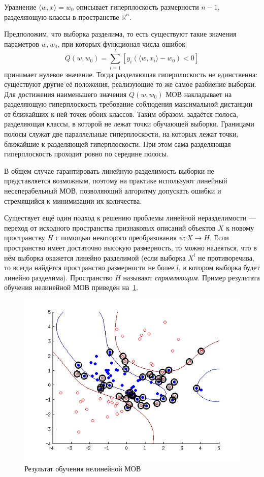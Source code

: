 Уравнение $ \langle w, x \rangle = w_0 $ описывает гиперплоскость размерности $ n - 1 $, разделяющую классы в пространстве $ \mathbb{R}^n $.

Предположим, что выборка разделима, то есть существуют такие значения параметров $ w, w_0 $, при которых функционал числа ошибок
\begin{equation*}
Q(w, w_0) = \sum_{i = 1}^l [y_i(\langle w, x_i \rangle - w_0) < 0]
\end{equation*}
принимает нулевое значение. Тогда разделяющая гиперплоскость не единственна: существуют другие её положения, реализующие то же самое разбиение выборки. Для достижения наименьшего значения $ Q(w, w_0) $ МОВ накладывает на разделяющую гиперплоскость требование соблюдения максимальной дистанции от ближайших к ней точек обоих классов. Таким образом, задаётся полоса, разделяющая классы, в которой не лежат точки обучающей выборки. Границами полосы служат две параллельные гиперплоскости, на которых лежат точки, ближайшие к разделяющей гиперплоскости. При этом сама разделяющая гиперплоскость проходит ровно по середине полосы.

В общем случае гарантировать линейную разделимость выборки не представляется возможным, поэтому на практике используют линейный несеперабельный МОВ, позволяющий алгоритму допускать ошибки и стремящийся к минимизации их количества.

Существует ещё один подход к решению проблемы линейной неразделимости --- переход от исходного пространства признаковых описаний объектов $ X $ к новому пространству $ H $ с помощью некоторого преобразования $ \psi: X \to H $. Если пространство имеет достаточно высокую размерность, то можно надеяться, что в нём выборка окажется линейно разделимой (если выборка $ X^l $ не противоречива, то всегда найдётся пространство размерности не более $ l $, в котором выборка будет линейно разделима). Пространство $ H $ называют \textit{спрямляющим}. Пример результата обучения нелинейной МОВ приведён на~\ref{fig:NonLinSVM}.

\begin{figure}[h]
     \centering
     \includegraphics[width=1\textwidth]{include/graphics/nonlin_svm}
     \caption{Результат обучения нелинейной МОВ}
     \label{fig:NonLinSVM}
\end{figure}


